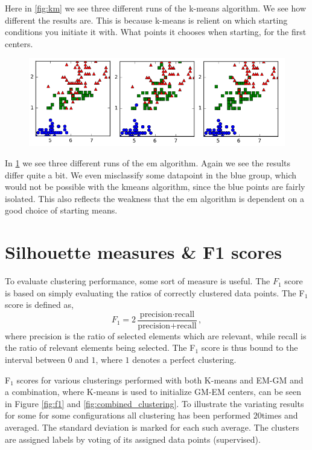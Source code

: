 \documentclass[a4paper,10pt,article,oneside,english]{memoir}
\let\oldcaption\caption
\renewcommand{\caption}[1]{\oldcaption{\emph{#1}}}
\begin{document}
Here in \ref{fig:km} we see three different runs of the k-means algorithm. We see how different the results are. This is because k-means is relient on which starting conditions you initiate it with. What points it chooses when starting, for the first centers.
\begin{figure}
	\centering
	\includegraphics[width=\textwidth]{em1.png}
	\caption{}
	\label{fig:em}
\end{figure}
In \ref{fig:em} we see three different runs of the em algorithm. Again we see the results differ quite a bit. We even misclassify some datapoint in the blue group, which would not be possible with the kmeans algorithm, since the blue points are fairly isolated. This also reflects the weakness that the em algorithm is dependent on a good choice of starting means.




\section*{Silhouette measures \& F1 scores}
To evaluate clustering performance, some sort of measure is useful. The $F_1$ score is based on simply evaluating the ratios of correctly clustered data points. The F$_1$ score is defined as,
$$F_1 = 2 \frac{\text{precision} \cdot \text{recall}}{\text{precision} + \text{recall}},$$
where precision is the ratio of selected elements which are relevant, while recall is the ratio of relevant elements being selected. The F$_1$ score is thus bound to the interval between $0$ and $1$, where $1$ denotes a perfect clustering. 

F$_1$ scores for various clusterings performed with both K-means and EM-GM and a combination, where K-means is used to initialize GM-EM centers, can be seen in Figure \ref{fig:f1} and \ref{fig:combined_clustering}. To illustrate the variating results for some for some configurations all clustering has been performed $20$times and averaged. The standard deviation is marked for each such average. The clusters are assigned labels by voting of its assigned data points (supervised).
\end{document}
